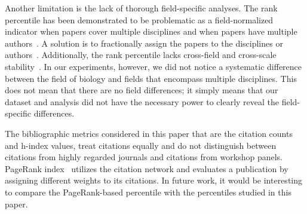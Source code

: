 Another limitation is the lack of thorough field-specific analyses. The rank percentile has been demonstrated to be problematic as a field-normalized indicator when papers cover multiple disciplines and when papers have multiple authors~\cite{bornmann2020evaluation}. A solution is to fractionally assign the papers to the disciplines or authors~\cite{waltman2011towards,waltman2015field}. Additionally, the rank percentile lacks cross-field and cross-scale stability~\cite{zitt2005relativity}. In our experiments, however, we did not notice a systematic difference between the field of biology and fields that encompass multiple disciplines. This does not mean that there are no field differences; it simply means that our dataset and analysis did not have the necessary power to clearly reveal the field-specific differences.

The bibliographic metrics considered in this paper that are the citation counts and h-index values, treat citations equally and do not distinguish between citations from highly regarded journals and citations from workshop panels. PageRank index~\cite{chen2007finding,walker2007ranking,ma2008bringing} utilizes the citation network and evaluates a publication by assigning different weights to its citations. In future work, it would be interesting to compare the PageRank-based percentile with the percentiles studied in this paper. 